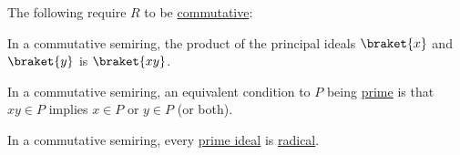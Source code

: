 \begin{proposition}
  The following require \( R \) to be \hyperref[def:semiring/commutative]{commutative}:
  \begin{thmenum}[series=thm:def:semiring_ideal/properties]
     In a commutative semiring, the product of the principal ideals \( \braket{x} \) and \( \braket{y} \) is \( \braket{xy} \).

     In a commutative semiring, an equivalent condition to \( P \) being \hyperref[def:semiring_ideal/prime]{prime} is that \( xy \in P \) implies \( x \in P \) or \( y \in P \) (or both).

     In a commutative semiring, every \hyperref[def:semiring_ideal/prime]{prime ideal} is \hyperref[def:radical_ideal]{radical}.
  \end{thmenum}
\end{proposition}
